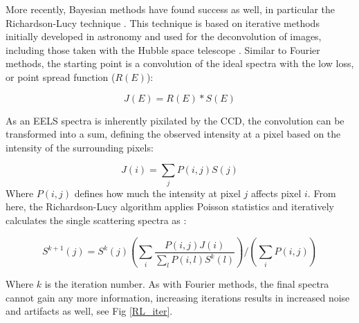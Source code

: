 More recently, Bayesian methods have found success as well, in particular the Richardson-Lucy technique \cite{richardson_lucy}. This technique is based on iterative methods initially developed in astronomy and used for the deconvolution of images, including those taken with the Hubble space telescope \cite{hubble}.  Similar to Fourier methods, the starting point is a convolution of the ideal spectra with the low loss, or point spread function ($R(E)$):

\begin{equation}
J(E) = R(E)\ast S(E)
\end{equation}

As an EELS spectra is inherently pixilated by the CCD, the convolution can be transformed into a sum, defining the observed intensity at a pixel based on the intensity of the surrounding pixels: 

\begin{equation}
	J(i) = \sum_{j} P(i,j) S(j)
\end{equation}
Where $P(i,j)$ defines how much the intensity at pixel $j$ affects pixel $i$.  
From here, the Richardson-Lucy algorithm applies Poisson statistics and iteratively calculates the single scattering spectra as  \cite{richardson_lucy}:  

\begin{equation}
S^{k+1}(j) = S^k(j) \left(\sum_{i} \frac{P(i,j)J(i)}{\sum_{l}P(i,l)S^k(l)}\right) \bigg/ \left( \sum_{i} P(i,j)\right)
\end{equation}

Where $k$ is the iteration number.  As with Fourier methods, the final spectra cannot gain any more information, increasing iterations results in increased noise and artifacts as well, see Fig \ref{RL_iter}.  

